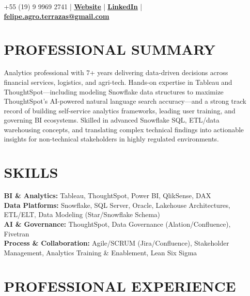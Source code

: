 \documentclass[9pt, letterpaper]{article}
\begin{document}
	\pagestyle{empty}

	 \hfill +55 (19) 9 9969 2741 | \href{https://feliperamiresterrazas.github.io/professionalwebsite/}{\textbf{Website}} | \href{https://www.linkedin.com/in/felipe-ramires-terrazas/}{\textbf{LinkedIn}} |
	\\
	 \hfill \href{mailto:felipe.agro.terrazas@gmail.com}{\textbf{felipe.agro.terrazas@gmail.com}}

	\section*{PROFESSIONAL SUMMARY}
	\noindent Analytics professional with 7+ years delivering data-driven decisions across financial services, logistics, and agri-tech. Hands-on expertise in Tableau and ThoughtSpot—including modeling Snowflake data structures to maximize ThoughtSpot's AI-powered natural language search accuracy—and a strong track record of building self-service analytics frameworks, leading user training, and governing BI ecosystems. Skilled in advanced Snowflake SQL, ETL/data warehousing concepts, and translating complex technical findings into actionable insights for non-technical stakeholders in highly regulated environments.

	\section*{SKILLS}
	\noindent \textbf{BI \& Analytics:} Tableau, ThoughtSpot, Power BI, QlikSense, DAX \\
	\noindent \textbf{Data Platforms:} Snowflake, SQL Server, Oracle, Lakehouse Architectures, ETL/ELT, Data Modeling (Star/Snowflake Schema) \\
	\noindent \textbf{AI \& Governance:} ThoughtSpot, Data Governance (Alation/Confluence), Fivetran \\
	\noindent \textbf{Process \& Collaboration:} Agile/SCRUM (Jira/Confluence), Stakeholder Management, Analytics Training \& Enablement, Lean Six Sigma

	\section*{PROFESSIONAL EXPERIENCE}
\end{document}
